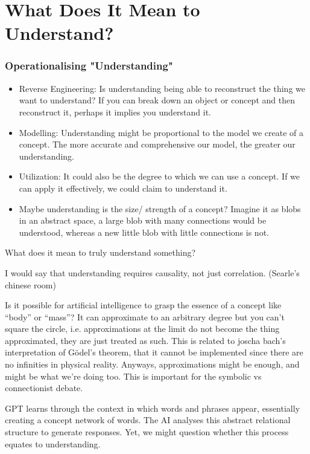 \section{What Does It Mean to Understand?}
\subsubsection{Operationalising "Understanding"}
\begin{itemize}
    \item Reverse Engineering: Is understanding being able to reconstruct the thing we want to understand? If you can break down an object or concept and then reconstruct it, perhaps it implies you understand it.
    \item Modelling: Understanding might be proportional to the model we create of a concept. The more accurate and comprehensive our model, the greater our understanding.
    \item Utilization: It could also be the degree to which we can use a concept. If we can apply it effectively, we could claim to understand it.
    \item Maybe understanding is the size/ strength of a concept? Imagine it as blobs in an abstract space, a large blob with many connections would be understood, whereas a new little blob with little connections is not. 
\end{itemize}



What does it mean to truly understand something? 

I would say that understanding requires causality, not just correlation. (Searle's chinese room)

Is it possible for artificial intelligence to grasp the essence of a concept like “body” or “mass”? It can approximate to an arbitrary degree but you can't square the circle, i.e. approximations at the limit do not become the thing approximated, they are just treated as such. This is related to joscha bach's interpretation of Gödel's theorem, that it cannot be implemented since there are no infinities in physical reality. Anyways, approximations might be enough, and might be what we're doing too. This is important for the symbolic vs connectionist debate.

GPT learns through the context in which words and phrases appear, essentially creating a concept network of words. The AI analyses this abstract relational structure to generate responses. Yet, we might question whether this process equates to understanding.

